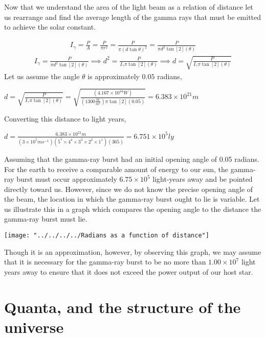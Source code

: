 \documentclass{article}
\begin{document}
 Now that we understand the area of the light beam as a relation of distance let us rearrange and find the average length of the gamma rays that must be emitted to achieve the solar constant.

\begin{gather*}
	I_\gamma = \frac{P}{A} =\frac{P}{\pi r^2} = \frac{P}{\pi \left(d\tan\theta\right)^2} = \frac{P}{\pi d^2\tan[2](\theta)} 
\end{gather*}
\begin{gather*}
	I_\gamma = \frac{P}{\pi d^2\tan[2](\theta)} \implies d^2 = \frac{P}{I_\gamma\pi\tan[2](\theta)} \implies  d = \sqrt{\frac{P}{I_\gamma\pi\tan[2](\theta)}}
\end{gather*}
Let us assume the angle $\theta$ is approximately $0.05$ radians,
\begin{center}
	$\boxed{d = \sqrt{\frac{P}{I_\gamma\pi\tan[2](\theta)}} = \sqrt{\frac{(4.167\times10^{44}W)}{(1300 \frac{W}{m^2})\pi\tan[2](0.05)}} = 6.383\times10^{21}m}
	$
\end{center}
Converting this distance to light years,

\begin{center}
 $\boxed{d = \frac{6.383\times10^{21}m}{(3\times10^5ms^{-1})(5^5\times4^4\times3^3\times2^2\times1^1)(365)}=6.751\times10^5ly}
 $	
\end{center}
Assuming that the gamma-ray burst had an initial opening angle of 0.05 radians. For the earth to receive a comparable amount of energy to our sun, the gamma-ray burst must occur approximately $6.75\times10^{5}$ light-years away and be pointed directly toward us. However, since we do not know the precise opening angle of the beam, the location in which the gamma-ray burst ought to lie is variable. Let us illustrate this in a graph which compares the opening angle to the distance the gamma-ray burst must lie. 
\begin{center}
	\texttt{[image: "../../../../Radians as a function of distance"]}
\end{center}
Though it is an approximation, however, by observing this graph, we may assume that it is necessary for the gamma-ray burst to be no more than $1.00\times10^7$ light years away to ensure that it does not exceed the power output of our host star.


\section{Quanta, and the structure of the universe} 
\end{document}
